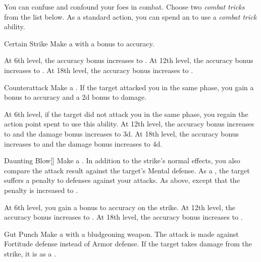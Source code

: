         You can confuse and confound your foes in combat.
        Choose two \textit{combat tricks} from the list below.
        As a standard action, you can spend an  to use a \textit{combat trick} ability.
        {
            \begin{ability}{Certain Strike}
                Make a  with a  bonus to accuracy.

                At 6th level, the accuracy bonus increases to .
                At 12th level, the accuracy bonus increases to .
                At 18th level, the accuracy bonus increases to .
            \end{ability}

            \begin{ability}{Counterattack}
                Make a .
                If the target attacked you in the same phase, you gain a  bonus to accuracy and a \plus2d bonus to damage.

                At 6th level, if the target did not attack you in the same phase, you regain the action point spent to use this ability.
                At 12th level, the accuracy bonus increases to  and the damage bonus increases to \plus3d.
                At 18th level, the accuracy bonus increases to  and the damage bonus increases to \plus4d.
            \end{ability}

            \begin{ability}{Daunting Blow}[]
                Make a .
                In addition to the strike's normal effects, you also compare the attack result against the target's Mental defense.
                \hit As a , the target suffers a  penalty to defenses against your attacks.
                \crit As above, except that the penalty is increased to .

                At 6th level, you gain a  bonus to accuracy on the strike.
                At 12th level, the accuracy bonus increases to .
                At 18th level, the accuracy bonus increases to .
            \end{ability}

            \begin{ability}{Gut Punch}
                Make a  with a bludgeoning weapon.
                The attack is made against Fortitude defense instead of Armor defense.
                If the target takes damage from the strike, it is \sickened as a .


\end{ability}}
